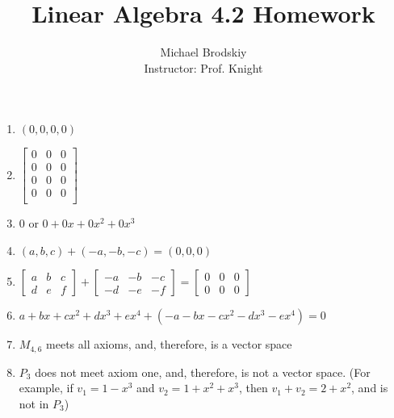\documentclass[12pt]{article}
\title{Linear Algebra 4.2 Homework}
\date{}
\author{Michael Brodskiy\\ \small Instructor: Prof. Knight}
\begin{document}
\maketitle

\begin{enumerate}

  \item $(0,0,0,0)$

    \setcounter{enumi}{2}

  \item $\left[ \begin{array}{ccc} 0 & 0 & 0\\ 0 & 0 & 0\\ 0 & 0 & 0\\ 0 & 0 & 0\\  \end{array} \right]$

    \setcounter{enumi}{4}

  \item $0$ or $0+0x+0x^2+0x^3$

    \setcounter{enumi}{6}

  \item $(a,b,c)+(-a,-b,-c)=(0,0,0)$

    \setcounter{enumi}{8}

  \item $\left[ \begin{array}{ccc} a & b & c\\ d & e & f \end{array} \right]+\left[ \begin{array}{ccc} -a & -b & -c\\ -d & -e & -f \end{array} \right]=\left[ \begin{array}{ccc} 0 & 0 & 0\\ 0 & 0 & 0 \end{array} \right]$

    \setcounter{enumi}{10}

  \item $a+bx+cx^2+dx^3+ex^4+(-a-bx-cx^2-dx^3-ex^4)=0$

    \setcounter{enumi}{12}

  \item $M_{4,6}$ meets all axioms, and, therefore, is a vector space

    \setcounter{enumi}{14}

  \item $P_3$ does not meet axiom one, and, therefore, is not a vector space. (For example, if $v_{1}=1-x^3$ and $v_{2}=1+x^2+x^3$, then $v_1+v_2=2+x^2$, and is not in $P_3$)


\end{enumerate}
\end{document}
